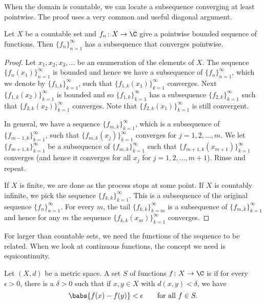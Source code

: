 When the domain is countable, we can locate a subsequence
converging at least pointwise.
The proof uses a very common and useful diagonal argument.

\begin{prop} \label{prop:subsequenceoncountableX}
Let $X$ be a countable set and $f_n \colon X \to \C$ give a pointwise bounded
sequence of functions.  Then $\{ f_n \}_{n=1}^\infty$ has a subsequence that converges
pointwise.
\end{prop}

\begin{proof}
Let $x_1,x_2,x_3,\ldots$ be an enumeration of the elements of $X$.
The sequence $\{ f_n(x_1) \}_{n=1}^\infty$ is bounded and hence
we have a subsequence of $\{ f_n \}_{n=1}^{\infty}$, which we denote by
$\{ f_{1,k} \}_{k=1}^\infty$,
such that
$\{ f_{1,k}(x_1) \}_{k=1}^\infty$ converges.
Next $\{ f_{1,k}(x_2) \}_{k=1}^\infty$ is bounded and so 
$\{ f_{1,k} \}_{k=1}^\infty$ has a subsequence
$\{ f_{2,k} \}_{k=1}^\infty$ such that
$\{ f_{2,k}(x_2) \}_{k=1}^\infty$ converges.  Note that
$\{ f_{2,k}(x_1) \}_{k=1}^\infty$ is still convergent.

In general, we have a sequence $\{ f_{m,k} \}_{k=1}^\infty$,
which is a subsequence of $\{ f_{m-1,k} \}_{k=1}^\infty$,
such that $\{ f_{m,k}(x_j) \}_{k=1}^\infty$ converges for $j=1,2,\ldots, m$.
We let $\{ f_{m+1,k} \}_{k=1}^\infty$ be a subsequence of
$\{ f_{m,k} \}_{k=1}^\infty$
such that
$\{ f_{m+1,k}(x_{m+1}) \}_{k=1}^\infty$ converges (and hence it converges for all
$x_j$ for $j=1,2,\ldots,m+1$).  Rinse and repeat.

If $X$ is finite, we are done as the process stops at some point.
If $X$ is countably infinite,
we pick the sequence
$\{ f_{k,k} \}_{k=1}^\infty$.
This is a subsequence of the original sequence $\{ f_n \}_{n=1}^\infty$.
For every $m$, the tail $\{ f_{k,k} \}_{k=m}^\infty$ is a subsequence of
$\{ f_{m,k} \}_{k=1}^\infty$
and hence for any $m$ the sequence $\{ f_{k,k}(x_m) \}_{k=1}^\infty$ converges.
\end{proof}

For larger than countable sets,
we need the functions of the sequence to be related.  When we look at
continuous functions, the concept we need is equicontinuity.

\begin{defn}
Let $(X,d)$ be a metric space.
A set $S$ of functions
$f \colon X \to \C$ is 
\emph{}
if for every $\epsilon > 0$, there is a $\delta > 0$
such that if $x,y \in X$ with $d(x,y) < \delta$, we have
\begin{equation*}
\babs{f(x)-f(y)} < \epsilon \qquad \text{for all } f \in S .
\end{equation*}
\end{defn}

